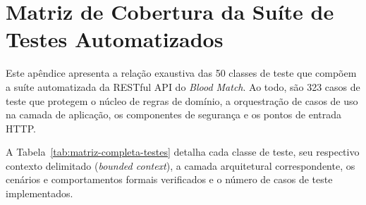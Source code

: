 \chapter{Matriz de Cobertura da Suíte de Testes Automatizados}
\label{apendice:matriz-testes}

Este apêndice apresenta a relação exaustiva das 50 classes de teste que compõem a suíte automatizada da RESTful API do \textit{Blood Match}. Ao todo, são 323 casos de teste que protegem o núcleo de regras de domínio, a orquestração de casos de uso na camada de aplicação, os componentes de segurança e os pontos de entrada HTTP.

A Tabela~\ref{tab:matriz-completa-testes} detalha cada classe de teste, seu respectivo contexto delimitado (\textit{bounded context}), a camada arquitetural correspondente, os cenários e comportamentos formais verificados e o número de casos de teste implementados.

